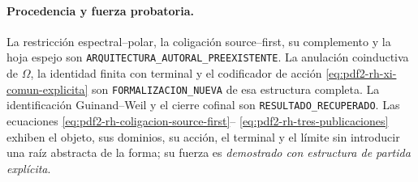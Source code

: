 \paragraph{Procedencia y fuerza probatoria.}
La restricción espectral--polar, la coligación source--first, su complemento y
la hoja espejo son \texttt{ARQUITECTURA\_AUTORAL\_PREEXISTENTE}. La
anulación coinductiva de \(\Omega\), la identidad finita con terminal y el
codificador de acción
\eqref{eq:pdf2-rh-xi-comun-explicita} son
\texttt{FORMALIZACION\_NUEVA} de esa estructura completa. La identificación
Guinand--Weil y el cierre cofinal son \texttt{RESULTADO\_RECUPERADO}. Las
ecuaciones
\eqref{eq:pdf2-rh-coligacion-source-first}--
\eqref{eq:pdf2-rh-tres-publicaciones} exhiben el objeto, sus dominios, su
acción, el terminal y el límite sin introducir una raíz abstracta de la forma;
su fuerza es \emph{demostrado con estructura de partida explícita}.
